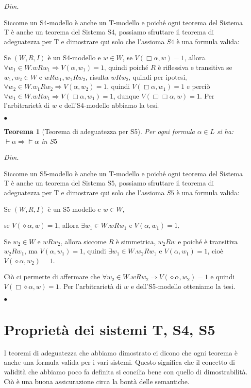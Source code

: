 \documentclass[a4paper, titlepage, 12pt]{report}
\newtheorem{theorem}{Teorema}[chapter]
\newenvironment{proof}
    {\textit{Dim.}
    }
    {\begin{flushright}$\bullet$\end{flushright}
    }
\begin{document}
\begin{proof}
Siccome un S4-modello è anche un T-modello e poiché ogni teorema del Sistema T
è anche un teorema del Sistema S4, possiamo sfruttare il teorema di adeguatezza per T
e dimostrare qui solo che l'assioma $S4$ è una formula valida:

Se $(W, R, I)$ è un S4-modello e $w \in W$,
se $V(\Box \alpha, w) = 1$, allora $\forall w_1 \in W. wRw_1 \Rightarrow V(\alpha, w_1) = 1$,
quindi poiché $R$ è riflessiva e transitiva
se $w_1, w_2 \in W$ e $wRw_1, w_1Rw_2$, risulta $wRw_2$, quindi per ipotesi,
$\forall w_2 \in W. w_1Rw_2 \Rightarrow V(\alpha, w_2) = 1$, quindi $V(\Box \alpha, w_1) = 1$
e perciò $\forall w_1 \in W. wRw_1 \Rightarrow V(\Box \alpha, w_1) = 1$,
dunque $V(\Box \Box \alpha, w) = 1$.
Per l'arbitrarietà di $w$ e dell'S4-modello abbiamo la tesi.
\end{proof}


\begin{theorem}[Teorema di adeguatezza per S5]
Per ogni formula $\alpha \in L$ si ha: $\vdash \alpha \Rightarrow \vDash \alpha$ in $S5$
\end{theorem}

\begin{proof}
Siccome un S5-modello è anche un T-modello e poiché ogni teorema del Sistema T
è anche un teorema del Sistema S5, possiamo sfruttare il teorema di adeguatezza per T
e dimostrare qui solo che l'assioma $S5$ è una formula valida:

Se $(W, R, I)$ è un S5-modello e $w \in W$,

se $V(\diamond \alpha, w) = 1$, allora $\exists w_1 \in W. wRw_1$ e $V(\alpha, w_1) = 1$,

Se $w_2 \in W$ e $wRw_2$, allora siccome $R$ è simmetrica, $w_2Rw$ e poiché
è transitiva $w_2Rw_1$, ma $V(\alpha, w_1) = 1$, quindi
$\exists w_1 \in W. w_2Rw_1$ e $V(\alpha, w_1) = 1$, cioè $V(\diamond \alpha, w_2) = 1$.

Ciò ci permette di affermare che $\forall w_2 \in W. wRw_2 \Rightarrow V(\diamond \alpha, w_2) = 1$
e quindi $V(\Box \diamond \alpha, w) = 1$.
Per l'arbitrarietà di $w$ e dell'S5-modello otteniamo la tesi.
\end{proof}

\section{Proprietà dei sistemi T, S4, S5}
I teoremi di adeguatezza che abbiamo dimostrato ci dicono che ogni teorema
è anche una formula valida per i vari sistemi.
Questo significa che il concetto di validità che abbiamo poco fa definita
si concilia bene con quello di dimostrabilità. Ciò è una buona assicurazione circa
la bontà delle semantiche.
\end{document}
